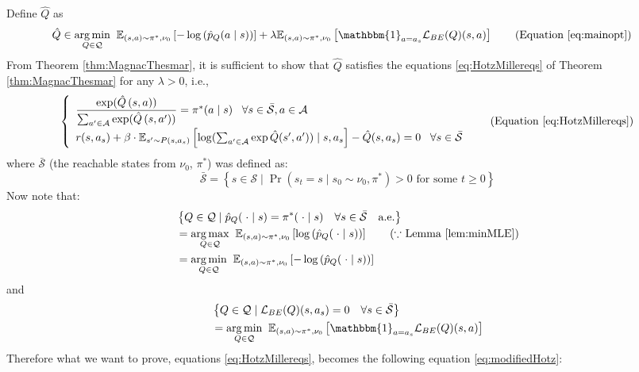 Define $\hat{Q}$ as 
%
\begin{align}
    \hat{Q} &\in \underset{Q\in \mathcal{Q}}{\arg\min } \; \;\mathbb{E}_{(s, a)\sim \pi^*, \nu_0}  \left[-\log\left(\hat{p}_{Q}(a
\mid s)\right)\right] + \lambda\mathbb{E}_{(s, a)\sim \pi^*, \nu_0}\left[ \mathbbm{1}_{a = a_s} \mathcal{L}_{BE}(Q)(s,a)\right] \tag{Equation \ref{eq:mainopt}}
\end{align}
From Theorem \ref{thm:MagnacThesmar}, it is sufficient to show that $\hat{Q}$
satisfies the equations \ref{eq:HotzMillereqs} of Theorem \ref{thm:MagnacThesmar} for any $\lambda>0$, i.e., 
\begin{equation}
\left\{
\begin{array}{l}
    \dfrac{\exp({\hat{Q}}\left(s,a\right))}{\sum_{a^\prime\in \mathcal{A}} \exp({\hat{Q}}\left(s,a^\prime\right))} = \pi^*(a
    \mid s) \; \; \; \forall s\in \bar{\mathcal{S}}, a \in \mathcal{A}
    \\[1em]
    r(s, a_s)+\beta \cdot \mathbb{E}_{s^{\prime} \sim P(s, a_s)}\left[\log(\sum_{a^\prime\in\mathcal{A}}\exp \hat{Q}(s^\prime, a^\prime)) \mid s, a_s\right]-\hat{Q}(s, a_s)=0 \;\;\; \forall s\in \bar{\mathcal{S}}
    
\end{array}\tag{Equation \ref{eq:HotzMillereqs}}
\right. 
\end{equation}
where $\bar{\mathcal{S}}$ (the reachable states from $\nu_0$, $\pi^\ast$) was defined as:
$$
\bar{\mathcal{S}}=\left\{s \in \mathcal{S} \mid \operatorname{Pr}\left(s_t=s \mid s_0 \sim \nu_0, \pi^*\right)>0 \text { for some } t \geq 0\right\} 
$$
Now note that:
  \begin{align}
     &\left\{Q \in \mathcal{Q} \mid\hat{p}_{Q}(\;\cdot
    \mid s) = \pi^*(\;\cdot
    \mid s)\quad  \forall s\in\bar{\mathcal{S}}\quad\text{a.e.}\right\} \notag
    \\
    &=\underset{Q\in \mathcal{Q}}{\arg\max } \; \;\mathbb{E}_{(s, a)\sim \pi^*, \nu_0}  \left[\log\left(\hat{p}_{Q}(\;\cdot
    \mid s)\right)\right] \tag{$\because$ Lemma \ref{lem:minMLE}}
    \\
    &=\underset{Q\in \mathcal{Q}}{\arg\min } \; \;\mathbb{E}_{(s, a)\sim \pi^*, \nu_0}  \left[-\log\left(\hat{p}_{Q}(\;\cdot
    \mid s)\right)\right] \notag
    \end{align}
and 
    \begin{align}
     &\left\{Q \in \mathcal{Q} \mid\mathcal{L}_{BE}(Q)(s,a_s) = 0\quad  \forall s\in\bar{\mathcal{S}}\right\} \notag
    \\
    &=\underset{Q\in \mathcal{Q}}{\arg\min } \; \;\mathbb{E}_{(s, a)\sim \pi^*, \nu_0}  \left[\mathbbm{1}_{a = a_s} \mathcal{L}_{BE}(Q)(s,a)\right] \notag
    \end{align}
Therefore what we want to prove, equations \ref{eq:HotzMillereqs}, becomes the following equation \ref{eq:modifiedHotz}:

